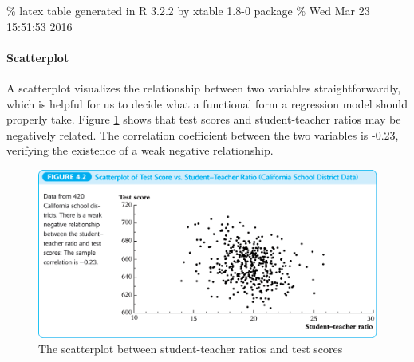 \documentclass[a4paper,11pt]{article}
\begin{document}
\begin{LaTeX}
\% latex table generated in R 3.2.2 by xtable 1.8-0 package
\% Wed Mar 23 15:51:53 2016
\begin{table}[ht]
\caption{Summary of the Distribution of Student-Teacher Ratios and
Fifth-Grade Test Scores for 420 K-8 Districts in California in 1999}
\label{tab:table4.1}
\centering
{}
\end{table}
\end{LaTeX}

\paragraph*{Scatterplot}
\label{sec:org6dbc755}
A scatterplot visualizes the relationship between two variables
straightforwardly, which is helpful for us to decide what a functional
form a regression model should properly take. Figure \ref{fig:org162f0d6}
shows that test scores and student-teacher ratios may be negatively
related. The correlation coefficient between the two variables is
-0.23, verifying the existence of a weak negative relationship.

\begin{figure}[htbp]
\centering
\includegraphics[width=1.0\textwidth]{img/fig-4-2.png}
\caption{\label{fig:org162f0d6}
The scatterplot between student-teacher ratios and test scores}
\end{figure}
\end{document}
